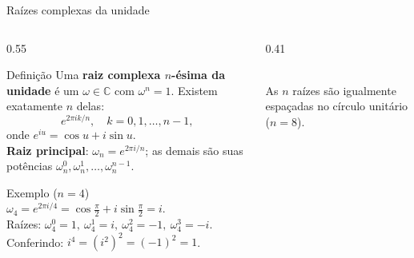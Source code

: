 \documentclass[aspectratio=169,10pt]{beamer}
\newcommand{\w}[2][n]{\omega_{#1}^{#2}}       %
\begin{document}
\begin{frame}{Raízes complexas da unidade}
  \begin{columns}[T]
    \begin{column}{0.55\textwidth}
      \begin{block}{Definição}
        Uma \textbf{raiz complexa $n$-ésima da unidade} é um $\omega \in \mathbb{C}$ com
        $\omega^n = 1$. Existem exatamente $n$ delas:
        \[
          e^{2\pi i k/n},\quad k = 0,1,\dots,n-1,
        \]
        onde $e^{iu} = \cos u + i\sin u$.\\[2pt]
        \textbf{Raiz principal}: $\omega_n = e^{2\pi i/n}$; as demais são
        suas potências $\w{0},\w{1},\dots,\w{n-1}$.
      \end{block}
      \begin{exampleblock}{Exemplo ($n=4$)}
        $\omega_4 = e^{2\pi i/4} = \cos\frac{\pi}{2} + i\sin\frac{\pi}{2} = i$.\\
        Raízes: $\w[4]{0}=1,\ \w[4]{1}=i,\ \w[4]{2}=-1,\ \w[4]{3}=-i$.\\
        Conferindo: $i^4 = (i^2)^2 = (-1)^2 = 1$.
      \end{exampleblock}
    \end{column}
    \begin{column}{0.41\textwidth}
      \centering
      \\
      {\scriptsize As $n$ raízes são igualmente espaçadas no círculo unitário ($n=8$).}
    \end{column}
  \end{columns}
\end{frame}
\end{document}
